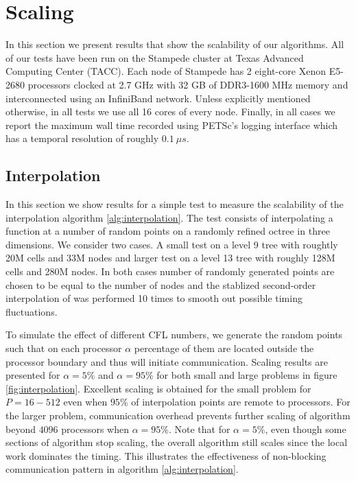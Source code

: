 \section{Scaling} \label{sec:scaling}
In this section we present results that show the scalability of our algorithms. All of our tests have been run on the Stampede cluster at Texas Advanced Computing Center (TACC). Each node of Stampede has 2 eight-core Xenon E5-2680 processors clocked at 2.7 GHz with 32 GB of DDR3-1600 MHz memory and interconnected using an InfiniBand network. Unless explicitly mentioned otherwise, in all tests we use all 16 cores of every node. Finally, in all cases we report the maximum wall time recorded using PETSc's logging interface which has a temporal resolution of roughly $0.1 \: \mu s$.

\subsection{Interpolation}
In this section we show results for a simple test to measure the scalability of the interpolation algorithm \ref{alg:interpolation}. The test consists of interpolating a function at a number of random points on a randomly refined octree in three dimensions. We consider two cases. A small test on a level 9 tree with roughtly 20M cells and 33M nodes and larger test on a level 13 tree with roughly 128M cells and 280M nodes. In both cases number of randomly generated points are chosen to be equal to the number of nodes and the stablized second-order interpolation of \cite{Min;Gibou:07:A-second-order-accur} was performed 10 times to smooth out possible timing fluctuations.

To simulate the effect of different CFL numbers, we generate the random points such that on each processor $\alpha$ percentage of them are located outside the processor boundary and thus will initiate communication. Scaling results are presented for $\alpha = 5 \%$ and $\alpha = 95\%$ for both small and large problems in figure \ref{fig:interpolation}. Excellent scaling is obtained for the small problem for $P = 16-512$ even when $95\%$ of interpolation points are remote to processors. For the larger problem, communication overhead prevents further scaling of algorithm beyond $4096$ processors when $\alpha = 95\%$. Note that for $\alpha = 5\%$, even though some sections of algorithm stop scaling, the overall algorithm still scales since the local work dominates the timing. This illustrates the effectiveness of non-blocking communication pattern in algorithm \ref{alg:interpolation}.

